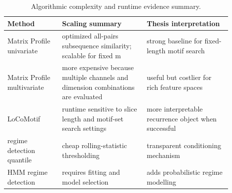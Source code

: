\begin{table}[ht]
\centering
\caption{Algorithmic complexity and runtime evidence summary.}
\begin{tabular}{p{0.22\linewidth}p{0.34\linewidth}p{0.34\linewidth}}
\hline
Method & Scaling summary & Thesis interpretation \\
\hline
Matrix Profile univariate & optimized all-pairs subsequence similarity; scalable for fixed m & strong baseline for fixed-length motif search \\
Matrix Profile multivariate & more expensive because multiple channels and dimension combinations are evaluated & useful but costlier for rich feature spaces \\
LoCoMotif & runtime sensitive to slice length and motif-set search settings & more interpretable recurrence object when successful \\
regime detection quantile & cheap rolling-statistic thresholding & transparent conditioning mechanism \\
HMM regime detection & requires fitting and model selection & adds probabilistic regime modelling \\
\hline
\end{tabular}
\end{table}
